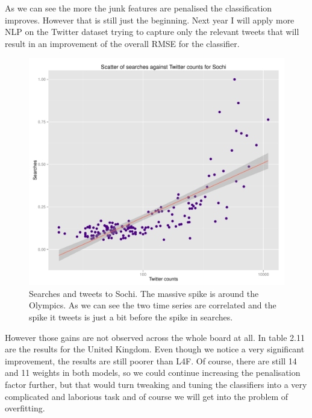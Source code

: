 \documentclass[minf,frontabs,twoside,singlespacing,parskip]{infthesis}
\begin{document}
As we can see the more the junk features are penalised the classification improves. However that is still just the beginning. Next year I will apply more NLP on the Twitter dataset trying to capture only the relevant tweets that will result in an improvement of the overall RMSE for the classifier. 


\begin{figure}[p]
\begin{center}
\includegraphics[scale=1.0]{Sochi}
\end{center}
\caption{Searches and tweets to Sochi. The massive spike is around the Olympics. As we can see the two time series are correlated and the spike it tweets is just a bit before the spike in searches.}
\end{figure}


However those gains are not observed across the whole board at all. In table 2.11 are the results for the United Kingdom. Even though we notice a  very significant improvement, the results are still poorer than L4F. Of course, there are still 14 and 11 weights in both models, so we could continue increasing the penalisation factor further, but that would turn tweaking and tuning the classifiers into a very complicated and laborious task and of course we will get into the problem of overfitting.
\end{document}
